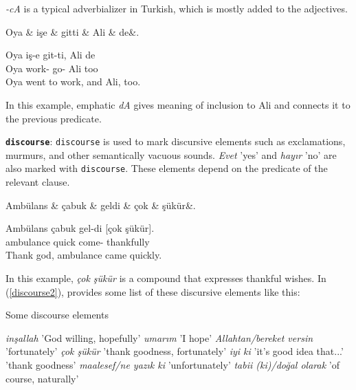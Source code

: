 \documentclass[11pt,a4paper]{article}
\begin{document}
\textit{-cA} is a typical adverbializer in Turkish, which is mostly added to the adjectives.

\begin{exe}
\ex \label{advmod:emph2}
\begin{dependency}
\begin{deptext}[column sep=0.24cm]
Oya \& işe \& gitti \& Ali \& de\&. \\
\end{deptext}
\end{dependency}
\gll Oya iş-e git-ti, Ali de  \\
Oya work-\Dat{} go-\Pst{} Ali too  \\
\glt Oya went to work, and Ali, too.
\end{exe}

In this example, emphatic \textit{dA} gives meaning of inclusion to Ali and connects it to the previous predicate.

\textbf{\texttt{discourse}}:
\texttt{discourse} is used to mark discursive elements such as exclamations, murmurs, and other semantically vacuous sounds. \textit{Evet} 'yes' and \textit{hayır} 'no' are also marked with \texttt{discourse}. These elements depend on the predicate of the relevant clause.  

\begin{exe}
\ex \label{discourse}
\begin{dependency}
\begin{deptext}[column sep=0.24cm]
Ambülans \& çabuk \& geldi \& çok \& şükür\&. \\
\end{deptext}
\end{dependency}
\gll Ambülans çabuk gel-di [çok şükür].  \\
ambulance quick come-\Pst{} thankfully  \\
\glt Thank god, ambulance came quickly.
\end{exe}

In this example, \textit{çok şükür} is a compound that expresses thankful wishes. In (\ref{discourse2}), \citep{goksel2005} provides some list of these discursive elements like this:

\begin{exe}
\ex \label{discourse2}Some discourse elements 
\begin{xlist}
\ex \textit{inşallah} 'God willing, hopefully'
\ex \textit{umarım} 'I hope'
\ex \textit{Allahtan/bereket versin} 'fortunately'
\ex \textit{çok şükür} 'thank goodness, fortunately'
\ex \textit{iyi ki} 'it's good idea that...' 'thank goodness'
\ex \textit{maalesef/ne yazık ki} 'unfortunately'
\ex \textit{tabii (ki)/doğal olarak} 'of course, naturally'
\end{xlist}
\end{exe}
\end{document}
